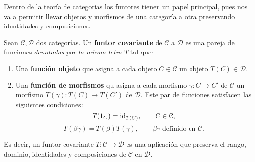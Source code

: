 Dentro de la teoría de categorías los funtores tienen un papel principal, pues nos va a permitir llevar objetos y morfismos de una categoría a otra preservando identidades y composiciones.

\begin{definicion}
	Sean $\mathcal{C}, \mathcal{D}$ dos categorías. Un \textbf{funtor covariante} de $\mathcal{C}$ a $\mathcal{D}$ es una pareja de funciones \textit{denotadas por la misma letra $T$} tal que:
	\begin{enumerate}
		\item Una \textbf{función objeto} que asigna a cada objeto $C \in \mathcal{C}$ un objeto $T(C) \in \mathcal{D}$.
		\item Una \textbf{función de morfismos} qu asigna a cada morfismo $\gamma: C \rightarrow C'$ de $\mathcal{C}$ un morfismo $T(\gamma): T(C) \rightarrow T(C')$ de $\mathcal{D}$. Este par de funciones satisfacen las siguientes condiciones:
		\begin{equation}
			T(1_C) = \operatorname{id}_{T(C)}, \qquad C \in \mathcal{C},
		\end{equation}
		\begin{equation}
			T(\beta \gamma) = T(\beta)T(\gamma), \qquad \beta \gamma \text{ definido en } \mathcal{C}.
		\end{equation}
	\end{enumerate}
\end{definicion}

Es decir, un funtor covariante $T: \mathcal{C} \rightarrow \mathcal{D}$ es una aplicación que preserva el rango, dominio, identidades y composiciones de $\mathcal{C}$ en $\mathcal{D}$.


\endinput
